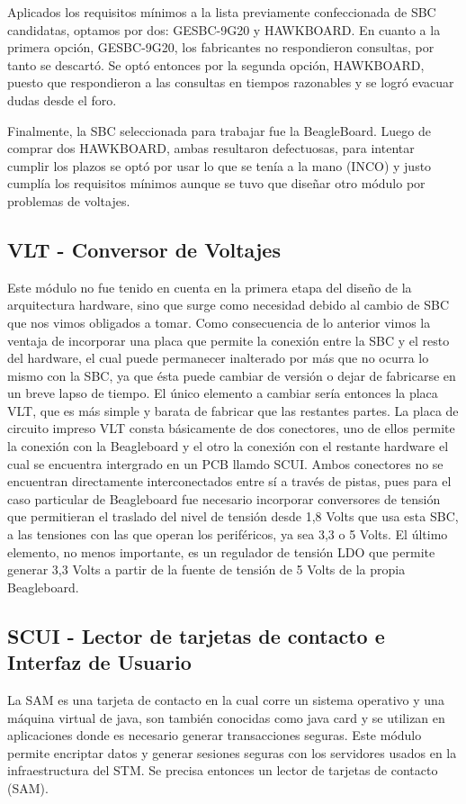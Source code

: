 

Aplicados los requisitos mínimos a la lista previamente confeccionada de SBC candidatas, optamos por dos: GESBC-9G20 y HAWKBOARD.
En cuanto a la primera opción, GESBC-9G20, los fabricantes no respondieron consultas, por tanto se descartó. Se optó entonces por la segunda opción, HAWKBOARD, puesto que respondieron a las consultas en tiempos razonables y se logró evacuar dudas desde el foro.


Finalmente, la SBC seleccionada para trabajar fue la BeagleBoard. Luego de comprar dos HAWKBOARD, ambas resultaron defectuosas, para intentar cumplir los plazos se optó por usar lo que se tenía a la mano (INCO) y justo cumplía los requisitos mínimos aunque se tuvo que diseñar otro módulo por problemas de voltajes.

\subsection{VLT - Conversor de Voltajes}
Este módulo no fue tenido en cuenta en la primera etapa del diseño de la arquitectura hardware, sino que surge como necesidad debido al cambio de SBC que nos vimos obligados a tomar. Como consecuencia de lo anterior vimos la ventaja de incorporar una placa que permite la conexión entre la SBC y el resto del hardware, el cual puede permanecer inalterado por más que no ocurra lo mismo con la SBC, ya que ésta puede cambiar de versión o dejar de fabricarse en un breve lapso de tiempo. El único elemento a cambiar sería entonces la placa VLT, que es más simple y barata de fabricar que las restantes partes.
La placa de circuito impreso VLT consta básicamente de dos conectores, uno de ellos permite la conexión con la Beagleboard y el otro la conexión con el restante hardware el cual se encuentra intergrado en un PCB llamdo SCUI. Ambos conectores no se encuentran directamente interconectados entre sí a través de pistas, pues para el caso particular de Beagleboard fue necesario incorporar conversores de tensión que permitieran el traslado del nivel de tensión desde 1,8 Volts que usa esta SBC, a las tensiones con las que operan los periféricos, ya sea 3,3 o 5 Volts.
El último elemento, no menos importante, es un regulador de tensión LDO que permite generar 3,3 Volts a partir de la fuente de tensión de 5 Volts de la propia Beagleboard.

\subsection{SCUI - Lector de tarjetas de contacto e Interfaz de Usuario}
La SAM es una tarjeta de contacto en la cual corre un sistema operativo y una máquina virtual de java, son también conocidas como java card y se utilizan en aplicaciones donde es necesario generar transacciones seguras. Este módulo permite encriptar datos y generar sesiones seguras con los servidores usados en la infraestructura del STM. Se precisa entonces un lector de tarjetas de contacto (SAM).


